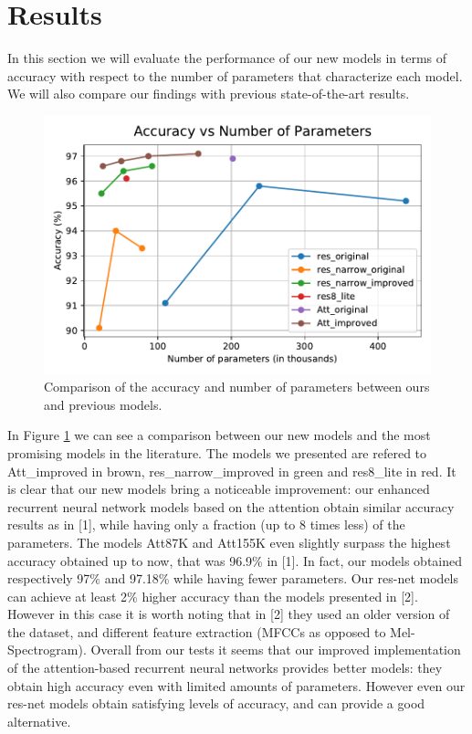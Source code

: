
\section{Results}
\label{sec:results}

In this section we will evaluate the performance of our new models in terms of accuracy with respect to the number of parameters that characterize each model. We will also compare our findings with previous state-of-the-art results.

\begin{figure}[htbp]
\centerline{\includegraphics[scale=.6]{acc_vs_par.pdf}}
\caption{Comparison of the accuracy and number of parameters between ours and previous models.}
\label{avp}
\end{figure}

In Figure \ref{avp} we can see a comparison between our new models and the most promising models in the literature. The models we presented are refered to Att\_improved in brown, res\_narrow\_improved in green and res8\_lite in red.
It is clear that our new models bring a noticeable improvement: our enhanced recurrent neural network models based on the attention obtain similar accuracy results as in [1], while having only a fraction (up to 8 times less) of the parameters. The models Att87K and Att155K even slightly surpass the highest accuracy obtained up to now, that was 96.9\% in [1]. In fact, our models obtained respectively 97\% and 97.18\% while having fewer parameters. 
Our res-net models can achieve at least 2\% higher accuracy than the models presented in [2]. However in this case it is worth noting that in [2] they used an older version of the dataset, and different feature extraction (MFCCs as opposed to Mel-Spectrogram). Overall from our tests it seems that our improved implementation of the attention-based recurrent neural networks provides better models: they obtain high accuracy even with limited amounts of parameters. However even our res-net models obtain satisfying levels of accuracy, and can provide a good alternative.

